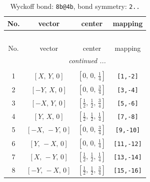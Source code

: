 \documentclass[fleqn,8pt]{jsarticle}
\begin{document}
\begin{longtable}{cccc}
\caption{Wyckoff bond: {\tt 8b@4b}, bond symmetry: {\tt 2..}}
 \\
 \hline \hline
No. & vector & center & mapping \\ \hline \endfirsthead

\multicolumn{3}{l}{\tablename\ \thetable{}} \\
 \hline \hline
No. & vector & center & mapping \\ \hline \endhead

 \hline \hline
\multicolumn{3}{r}{\footnotesize\it continued ...} \\ \endfoot

 \hline \hline
\multicolumn{3}{r}{} \\ \endlastfoot

1 & $\left[ X,\, Y,\, 0 \right]$ & $\left[ 0,\, 0,\, \frac{1}{4} \right]$ & {\tt [1,-2]} \\ \hline
2 & $\left[ - Y,\, X,\, 0 \right]$ & $\left[ 0,\, 0,\, \frac{3}{4} \right]$ & {\tt [3,-4]} \\ \hline
3 & $\left[ - X,\, Y,\, 0 \right]$ & $\left[ \frac{1}{2},\, \frac{1}{2},\, \frac{3}{4} \right]$ & {\tt [5,-6]} \\ \hline
4 & $\left[ Y,\, X,\, 0 \right]$ & $\left[ \frac{1}{2},\, \frac{1}{2},\, \frac{1}{4} \right]$ & {\tt [7,-8]} \\ \hline
5 & $\left[ - X,\, - Y,\, 0 \right]$ & $\left[ 0,\, 0,\, \frac{3}{4} \right]$ & {\tt [9,-10]} \\ \hline
6 & $\left[ Y,\, - X,\, 0 \right]$ & $\left[ 0,\, 0,\, \frac{1}{4} \right]$ & {\tt [11,-12]} \\ \hline
7 & $\left[ X,\, - Y,\, 0 \right]$ & $\left[ \frac{1}{2},\, \frac{1}{2},\, \frac{1}{4} \right]$ & {\tt [13,-14]} \\ \hline
8 & $\left[ - Y,\, - X,\, 0 \right]$ & $\left[ \frac{1}{2},\, \frac{1}{2},\, \frac{3}{4} \right]$ & {\tt [15,-16]} \\
\end{longtable}
\renewcommand{\arraystretch}{1.2}
\end{document}
